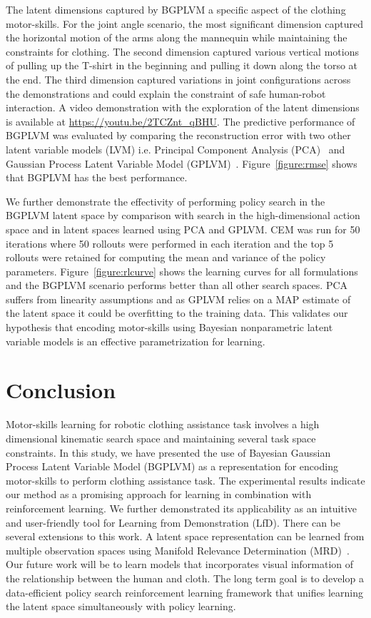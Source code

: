 \documentclass{article}
\begin{document}
The latent dimensions captured by BGPLVM a specific aspect of the clothing motor-skills. For the joint angle scenario, the most significant dimension captured the horizontal motion of the arms along the mannequin while maintaining the constraints for clothing. The second dimension captured various vertical motions of pulling up the T-shirt in the beginning and pulling it down along the torso at the end. The third dimension captured variations in joint configurations across the demonstrations and could explain the constraint of safe human-robot interaction. A video demonstration with the exploration of the latent dimensions is available at \url{https://youtu.be/2TCZnt_qBHU}. The predictive performance of BGPLVM was evaluated by comparing the reconstruction error with two other latent variable models (LVM) i.e. Principal Component Analysis (PCA)~\cite{pca} and Gaussian Process Latent Variable Model (GPLVM)~\cite{gplvm}. Figure~\ref{figure:rmse} shows that BGPLVM has the best performance.

We further demonstrate the effectivity of performing policy search in the BGPLVM latent space by comparison with search in the high-dimensional action space and in latent spaces learned using PCA and GPLVM. CEM was run for 50 iterations where 50 rollouts were performed in each iteration and the top 5 rollouts were retained for computing the mean and variance of the policy parameters. Figure~\ref{figure:rlcurve} shows the learning curves for all formulations and the BGPLVM scenario performs better than all other search spaces. PCA suffers from linearity assumptions and as GPLVM relies on a MAP estimate of the latent space it could be overfitting to the training data. This validates our hypothesis that encoding motor-skills using Bayesian nonparametric latent variable models is an effective parametrization for learning.

\section{Conclusion}
\label{section:conclusion}

Motor-skills learning for robotic clothing assistance task involves a high dimensional kinematic search space and maintaining several task space constraints. In this study, we have presented the use of Bayesian Gaussian Process Latent Variable Model (BGPLVM) as a representation for encoding motor-skills to perform clothing assistance task. The experimental results indicate our method as a promising approach for learning in combination with reinforcement learning. We further demonstrated its applicability as an intuitive and user-friendly tool for Learning from Demonstration (LfD). There can be several extensions to this work. A latent space representation can be learned from multiple observation spaces using Manifold Relevance Determination (MRD)~\cite{mrd}. Our future work will be to learn models that incorporates visual information of the relationship between the human and cloth. The long term goal is to develop a data-efficient policy search reinforcement learning framework that unifies learning the latent space simultaneously with policy learning.
\end{document}
